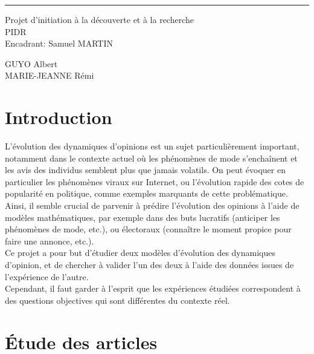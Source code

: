 \documentclass{scrreprt}
\date{}
\begin{document}
\begin{flushright}
    \rule{16cm}{5pt}\vskip1cm
    \begin{bfseries}
        \Huge{Projet d'initiation à la découverte et à la recherche \\ PIDR}\\
        \vspace{1.9cm}
        \LARGE{Encadrant: Samuel MARTIN}\\
       \vspace{10.9cm}
	\begin{center}
		GUYO Albert\\
		MARIE-JEANNE Rémi\\
	\end{center}
        \vspace{1.9cm}
    \end{bfseries}
\end{flushright}

\tableofcontents
\newpage
 

\chapter{Introduction}

L’évolution des dynamiques d’opinions est un sujet particulièrement important, notamment dans le contexte actuel où les phénomènes de mode s’enchaînent et les avis des individus semblent plus que jamais volatils. On peut évoquer en particulier les phénomènes viraux sur Internet, ou l’évolution rapide des cotes de popularité en politique, comme exemples marquants de cette problématique.\\

Ainsi, il semble crucial de parvenir à prédire l’évolution des opinions à l’aide de modèles mathématiques, par exemple dans des buts lucratifs (anticiper les phénomènes de mode, etc.), ou électoraux (connaître le moment propice pour faire une annonce, etc.).\\

Ce projet a pour but d’étudier deux modèles d’évolution des dynamiques d’opinion, et de chercher à valider l’un des deux à l’aide des données issues de l’expérience de l’autre. \\

Cependant, il faut garder à l’esprit que les expériences étudiées correspondent à des questions objectives qui sont différentes du contexte réel.\\


\chapter{Étude des articles}
\end{document}
